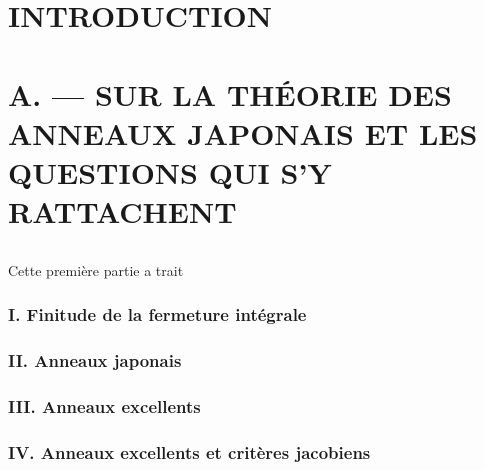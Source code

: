 



\setcounter{page}{1}
\chapter*{INTRODUCTION}\thispagestyle{empty}
\label{sec:1}
\section*{}

\chapter*{A. --- SUR LA THÉORIE DES ANNEAUX JAPONAIS ET LES QUESTIONS QUI S'Y RATTACHENT}\thispagestyle{empty}
\label{sec:a}
\section*{}

Cette première partie a trait

\subsection*{I. Finitude de la fermeture intégrale}\label{sec:1}%

\subsection*{II. Anneaux japonais}\label{sec:2}%

\subsection*{III. Anneaux excellents}\label{sec:3}%

\subsection*{IV. Anneaux excellents et critères jacobiens}\label{sec:4}%

